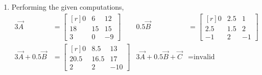 \begin{enumerate}
    \item Performing the given computations,
          \begin{align}
              3\vec{A}                        & = \begin{bmatrix*}[r]
                                                      0  & 6  & 12 \\
                                                      18 & 15 & 15 \\
                                                      3  & 0  & -9
                                                  \end{bmatrix*} &
              0.5\Vec{B}                      & = \begin{bmatrix*}[r]
                                                      0   & 2.5 & 1  \\
                                                      2.5 & 1.5 & 2  \\
                                                      -1  & 2   & -1
                                                  \end{bmatrix*} \\
              3\vec{A} + 0.5\vec{B}           & = \begin{bmatrix*}[r]
                                                      0    & 8.5  & 13  \\
                                                      20.5 & 16.5 & 17  \\
                                                      2    & 2    & -10
                                                  \end{bmatrix*} &
              3\vec{A} + 0.5\vec{B} + \vec{C} & = \text{invalid}
          \end{align}


\end{enumerate}
